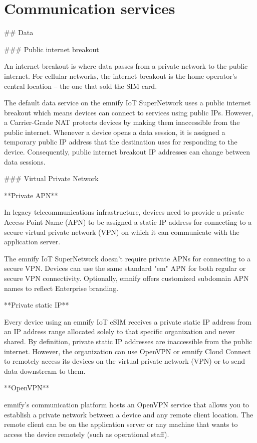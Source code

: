 \documentclass[11pt, oneside]{article}   	%
\begin{document}
\section{Communication services}

\begin{markdown}

## Data

### Public internet breakout

An internet breakout is where data passes from a private network to the public internet.
For cellular networks, the internet breakout is the home operator's central location -- the one that sold the SIM card.

The default data service on the emnify IoT SuperNetwork uses a public internet breakout which means devices can connect to services using public IPs.
However, a Carrier-Grade NAT protects devices by making them inaccessible from the public internet.
Whenever a device opens a data session, it is assigned a temporary public IP address that the destination uses for responding to the device.
Consequently, public internet breakout IP addresses can change between data sessions.

### Virtual Private Network

**Private APN**

In legacy telecommunications infrastructure, devices need to provide a private Access Point Name (APN) to be assigned a static IP address for connecting to a secure virtual private network (VPN) on which it can communicate with the application server.

The emnify IoT SuperNetwork doesn't require private APNs for connecting to a secure VPN.
Devices can use the same standard "em" APN for both regular or secure VPN connectivity. 
Optionally, emnify offers customized subdomain APN names to reflect Enterprise branding. 

**Private static IP**

Every device using an emnify IoT eSIM receives a private static IP address from an IP address range allocated solely to that specific organization and never shared.
By definition, private static IP addresses are inaccessible from the public internet.
However, the organization can use OpenVPN or emnify Cloud Connect to remotely access its devices on the virtual private network (VPN) or to send data downstream to them.

**OpenVPN**

emnify's communication platform hosts an OpenVPN service that allows you to establish a private network between a device and any remote client location.
The remote client can be on the application server or any machine that wants to access the device remotely (such as operational staff).


\end{markdown}
\end{document}
